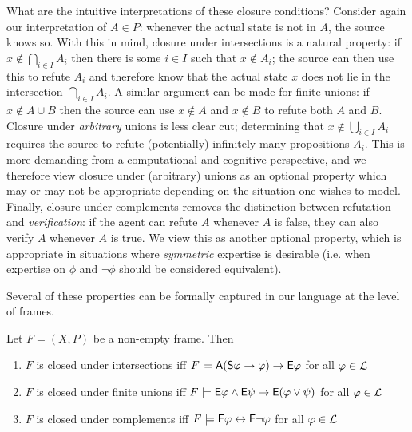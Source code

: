 What are the intuitive interpretations of these closure conditions? Consider
again our interpretation of $A \in P$: whenever the actual state is not in $A$,
the source knows so. With this in mind, closure under intersections is a
natural property: if $x \notin \bigcap_{i \in I}{A_i}$ then there is some $i
\in I$ such that $x \notin A_i$; the source can then use this to refute $A_i$
and therefore know that the actual state $x$ does not lie in the intersection
$\bigcap_{i \in I}{A_i}$. A similar argument can be made for finite unions: if
$x \notin A \cup B$ then the source can use $x \notin A$ and $x \notin B$ to
refute both $A$ and $B$. Closure under \emph{arbitrary} unions is less clear
cut; determining that $x \notin \bigcup_{i \in I}{A_i}$ requires the source to
refute (potentially) infinitely many propositions $A_i$.  This is more
demanding from a computational and cognitive perspective, and we therefore view
closure under (arbitrary) unions as an optional property which may or may not
be appropriate depending on the situation one wishes to model. Finally,
closure under complements removes the distinction between refutation and
\emph{verification}: if the agent can refute $A$ whenever $A$ is false, they
can also verify $A$ whenever $A$ is true. We view this as another optional
property, which is appropriate in situations where \emph{symmetric} expertise
is desirable (i.e. when expertise on $\phi$ and $\neg\phi$ should be considered
equivalent).

Several of these properties can be formally captured in our language at the
level of frames.

\begin{proposition}
\label{prop_frame_conditions}

    Let $F = (X, P)$ be a non-empty frame. Then

    \begin{enumerate}\small

        \item\label{item_frame_condition_intersections} $F$ is closed under
            intersections iff $F \models \mathsf{A}(\mathsf{S}\varphi \to \varphi) \to
            \mathsf{E}\varphi$ for all $\varphi \in \mathcal{L}$

        \item\label{item_frame_condition_finunions} $F$ is closed under finite
            unions iff $F \models \mathsf{E}\varphi \land \mathsf{E}\psi \to \mathsf{E}(\varphi \lor
            \psi)$ for all $\varphi \in \mathcal{L}$

        \item\label{item_frame_condition_compl} $F$ is closed under complements
            iff $F \models \mathsf{E}\varphi \leftrightarrow \mathsf{E}\neg\varphi$ for all $\varphi \in \mathcal{L}$

    \end{enumerate}
\end{proposition}

